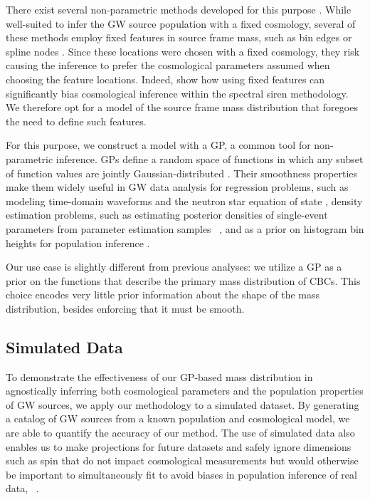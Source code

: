 \documentclass[preprint2,linenumbers]{aastex631}
\begin{document}
There exist several non-parametric methods developed for this purpose \citep{tiwari_vamana_2021,edelman_aint_2022,sadiq_flexible_2022,rinaldi_hdpgmm_2022,edelman_cover_2023,mandel_extracting_2019,ray_non-parametric_2023,callister_parameter-free_2023}.
While well-suited to infer the \ac{GW} source population with a fixed cosmology, several of these methods employ fixed features in source frame mass, such as bin edges \citep{mandel_extracting_2019,ray_non-parametric_2023} or spline nodes \citep{edelman_aint_2022}.
Since these locations were chosen with a fixed cosmology, they risk causing the inference to prefer the cosmological parameters assumed when choosing the feature locations. 
Indeed, \citet{mastrogiovanni_importance_2021} show how using fixed features can significantly bias cosmological inference within the spectral siren methodology.
We therefore opt for a model of the source frame mass distribution that foregoes the need to define such features.

For this purpose, we construct a model with a \acf{GP}, a common tool for non-parametric inference. 
\Acp{GP} define a random space of functions in which any subset of function values are jointly Gaussian-distributed \citep{rasmussen_gaussian_2006}.
Their smoothness properties make them widely useful in \ac{GW} data analysis for regression problems, such as modeling time-domain waveforms \citep{doctor_statistical_2017, huerta_eccentric_2018} and the neutron star equation of state \citep{landry_nonparametric_2019}, density estimation problems, such as estimating posterior densities of single-event parameters from parameter estimation samples ~\citep{demilio_density_2021}, and as a prior on histogram bin heights for population inference \citep{mandel_model-independent_2017, li_flexible_2021, ray_non-parametric_2023}.

Our use case is slightly different from previous analyses:
we utilize a \ac{GP} as a prior on the functions that describe the primary mass distribution of \acp{CBC}.
This choice encodes very little prior information about the shape of the mass distribution, besides enforcing that it must be smooth.

\subsection{Simulated Data}
\label{sec:data generation}
To demonstrate the effectiveness of our \ac{GP}-based mass distribution in agnostically inferring both cosmological parameters and the population properties of \ac{GW} sources, we apply our methodology to a simulated dataset.
By generating a catalog of \ac{GW} sources from a known population and cosmological model, we are able to quantify the accuracy of our method.
The use of simulated data also enables us to make projections for future datasets and safely ignore dimensions such as spin that do not impact cosmological measurements but would otherwise be important to simultaneously fit to avoid biases in population inference of real data, ~\citep{biscoveanu_sources_2021}.
\end{document}
